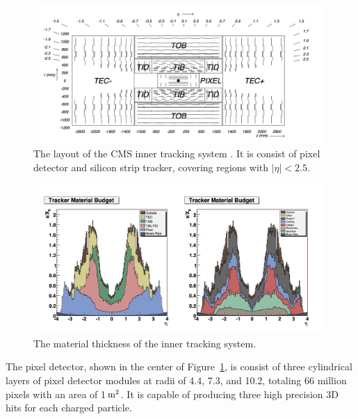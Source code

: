 \begin{figure}[ht]
    \centering
    \includegraphics[width=0.98\textwidth]{chapters/CMSExperiment/sectionDetector/figures/tracker.png}
    \caption{The layout of the CMS inner tracking system \cite{exhep:cms:Chatrchyan:2008aa}. It is consist of pixel detector and silicon strip tracker, covering regions with $|\eta|<2.5$. }
    \label{fig:cmsExperiment:detector:tracker}
\end{figure}


\begin{figure}[ht]
    \centering
    \includegraphics[width=0.98\textwidth]{chapters/CMSExperiment/sectionDetector/figures/trackerMaterial.png}
    \caption{The material thickness of the inner tracking system.}
    \label{fig:cmsExperiment:detector:trackerMaterial}
\end{figure}




The pixel detector, shown in the center of Figure~\ref{fig:cmsExperiment:detector:tracker}, is consist of three cylindrical layers of pixel detector modules at radii of 4.4, 7.3, and 10.2\cm, totaling 66 million pixels with an area of 1\,$\rm m^2$. It is capable of producing three high precision 3D hits for each charged particle. 


